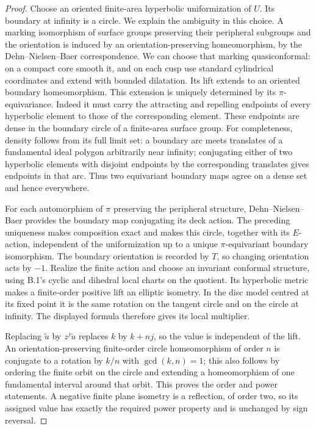 \begin{proof}
Choose an oriented finite-area hyperbolic uniformization of $U$. Its boundary
at infinity is a circle. We explain the ambiguity in this choice. A marking
isomorphism of surface groups preserving their peripheral subgroups and the
orientation is induced by an orientation-preserving homeomorphism, by the
Dehn--Nielsen--Baer correspondence. We can choose that marking quasiconformal:
on a compact core smooth it, and on each cusp use standard cylindrical
coordinates and extend with bounded dilatation. Its lift extends to an oriented
boundary homeomorphism. This extension is uniquely determined by its
$\pi$-equivariance. Indeed it must carry the attracting and repelling endpoints
of every hyperbolic element to those of the corresponding element. These
endpoints are dense in the boundary circle of a finite-area surface group.
For completeness, density follows from its full limit set: a boundary arc
meets translates of a fundamental ideal polygon arbitrarily near infinity;
conjugating either of two hyperbolic elements with disjoint endpoints by the
corresponding translates gives endpoints in that arc. Thus two equivariant
boundary maps agree on a dense set and hence everywhere.

For each automorphism of $\pi$ preserving the peripheral structure,
Dehn--Nielsen--Baer provides the boundary map conjugating its deck action.
The preceding uniqueness makes composition exact and makes this circle,
together with its $E$-action, independent of the uniformization up to a unique
$\pi$-equivariant boundary isomorphism. The boundary orientation is recorded by
$T$, so changing orientation acts by $-1$. Realize the finite action and choose
an invariant conformal structure, using B.1's cyclic and dihedral local charts
on the quotient. Its hyperbolic metric makes a finite-order positive lift an
elliptic isometry. In the disc model centred at its fixed point it is the same
rotation on the tangent circle and on the circle at infinity. The displayed
formula therefore gives its local multiplier.

Replacing $\widetilde u$ by $z^j\widetilde u$ replaces $k$ by $k+nj$, so the
value is independent of the lift. An orientation-preserving finite-order circle
homeomorphism of order $n$ is conjugate to a rotation by $k/n$ with
$\gcd(k,n)=1$; this also follows by ordering the finite orbit on the circle
and extending a homeomorphism of one fundamental interval around that orbit.
This proves the order and power statements. A negative finite plane isometry
is a reflection, of order two, so its assigned value has exactly the required
power property and is unchanged by sign reversal.


\end{proof}
